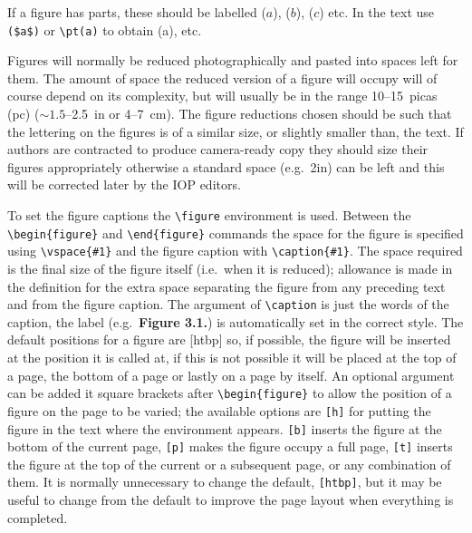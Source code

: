 If a figure has parts, these 
should be labelled ($a$), ($b$), ($c$) etc. In the text use \verb"($a$)" or 
\verb"\pt(a)" to obtain \pt(a), etc.

Figures will normally be reduced photographically and pasted into
spaces left for them.
The amount of space the reduced version of a figure will occupy will 
of course depend on its complexity, but will usually be in the range 
10--15~picas (pc) ($\sim1.5$--2.5~in or 4--7~cm). The figure reductions chosen should be 
such that the lettering on the figures is of a similar size, or slightly 
smaller than, the text. If authors are contracted to produce camera-ready 
copy they should size their figures appropriately otherwise a standard 
space (e.g.\ 2in) can be left and this will be corrected later by the 
IOP editors. 



To set the figure captions 
the  \verb"\figure" environment is used.
Between the \verb"\begin{figure}" and \verb"\end{figure}"
commands the space for the figure is specified using 
\verb"\vspace{#1}" and the figure caption with \verb"\caption{#1}".
The space required is the final size of the figure itself 
(i.e.\ when it is 
reduced); 
allowance is made in the definition for the extra space separating the 
figure from any preceding text and from the figure caption.
The argument of \verb"\caption" is just the words of the caption, 
the label (e.g.\ {\bf Figure 
3.1.}) is automatically set in the correct style. 
The default positions for a figure are [htbp] so, if possible, the 
figure will be inserted at the position it is called at, if this is not
possible it will be placed at the 
top of a page, the bottom of a page or lastly on a page by itself. 
An optional 
argument can be added it square brackets 
after \verb"\begin{figure}" to allow 
the position of a figure on the page to be 
varied; 
the available options are \verb"[h]" for putting the figure 
in the text where the environment appears. 
\verb"[b]"
inserts the figure at the bottom of the current page, 
\verb"[p]" makes the figure 
occupy a full page, \verb"[t]" inserts the figure at the top of the
current or a subsequent page, or any combination of them. 
It is normally unnecessary to change the default,  \verb"[htbp]", but 
it may be useful to change from the default to improve the 
page layout when everything is completed.

